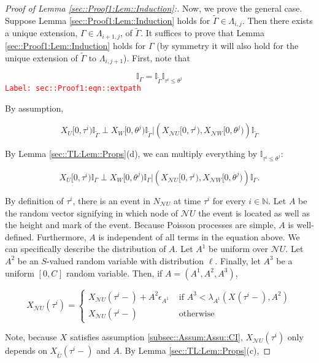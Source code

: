 \documentclass[12pt]{article}
\newcommand{\mb}{\mathbb}
\newcommand{\mc}{\mathcal}
\newcommand{\ov}{\overline}
\newcommand{\te}{\text}
\newcommand{\ep}{\epsilon}
\newcommand{\tr}{\textcolor{red}}
\newcommand{\labe}[1]{\tr{\texttt{Label: #1}}}
\newcommand{\ind}{\hspace{24pt}}
\newcommand{\neigh}{\mc{N}}					%
\renewcommand{\U}{U}							%
\newcommand{\UU}{W}								%
\newcommand{\cl}{\ov}							%
\renewcommand{\S}{S}							%
\newcommand{\ev}[1]{\ep_{#1}}					%
\newcommand{\poiss}[1]{N_{#1}}						%
\newcommand{\rt}[1]{\tau^{#1}}						%
\newcommand{\rtt}[1]{\theta^{#1}}					%
\newcommand{\itt}{i}								%
\newcommand{\ittt}{j}								%
\newcommand{\rxvt}[2]{X_{#1}{(#2)}}					%
\newcommand{\rxvts}[2]{X_{#1}{#2}}					%
\newcommand{\rate}[1]{\lambda_{#1}}					%
\newcommand{\const}[1]{C_{#1}}						%
\newcommand{\Sm}{\ell}								%
\newcommand{\alt}{\widetilde}						%
\newcommand{\apath}{\Gamma}						%
\newcommand{\pathset}[2]{\Lambda_{#1,#2}}			%
\newcommand{\rv}{A}								%
\begin{document}
\begin{proof}[Proof of Lemma \ref{sec::Proof1:Lem::Induction}:]
\ind Now, we prove the general case. Suppose Lemma \ref{sec::Proof1:Lem::Induction} holds for \(\alt{\apath} \in \pathset{\itt}{\ittt}\). Then there exists a unique extension, \(\apath \in \pathset{\itt+1}{\ittt}\), of \(\alt{\apath}\). It suffices to prove that Lemma \ref{sec::Proof1:Lem::Induction} holds for \(\apath\) (by symmetry it will also hold for the unique extension of \(\alt{\apath} \te{ to } \pathset{\itt}{\ittt+1}\)). First, note that

\begin{equation}
\mb{I}_{\apath} = \mb{I}_{\alt{\apath}}\mb{I}_{\rt{\itt} \leq \rtt{\ittt}}
\label{sec::Proof1:eqn::extpath}
\end{equation}
\labe{sec::Proof1:eqn::extpath}

By assumption,

\[\rxvts{\U}{[0,\rt{\itt})}\mb{I}_{\alt{\apath}}\perp \rxvts{\UU}{[0,\rtt{\ittt})}\mb{I}_{\alt{\apath}}|\left(\rxvts{\neigh{\U}}{[0,\rt{\itt})},\rxvts{\neigh{\UU}}{[0,\rtt{\ittt})}\right)\mb{I}_{\alt{\apath}}\]

By Lemma \ref{sec::TL:Lem::Props}(d), we can multiply everything by \(\mb{I}_{\rt{\itt} \leq \rtt{\ittt}}\):

\[\rxvts{\U}{[0,\rt{\itt})}\mb{I}_{\apath}\perp \rxvts{\UU}{[0,\rtt{\ittt})}\mb{I}_{\apath}|\left(\rxvts{\neigh{\U}}{[0,\rt{\itt})},\rxvts{\neigh{\UU}}{[0,\rtt{\ittt})}\right)\mb{I}_{\apath}.\]

By definition of \(\rt{\itt}\), there is an event in \(\poiss{\neigh{\U}}\) at time \(\rt{\itt}\) for every \(\itt \in \mb{ N}\). Let \(\rv\) be the random vector signifying in which node of \(\neigh{\U}\) the event is located as well as the height and mark of the event. Because Poisson processes are simple, \(\rv\) is well-defined. Furthermore, \(\rv\) is independent of all terms in the equation above. We can specifically describe the distribution of \(\rv\). Let \(\rv^1\) be uniform over \(\neigh{\U}\). Let \(\rv^2\) be an \(\S\)-valued random variable with distribution \(\Sm\). Finally, let \(\rv^3\) be a uniform \([0,\const{}]\) random variable. Then, if \(\rv=(\rv^1,\rv^2,\rv^3)\),

\[\rxvt{\neigh{\U}}{\rt{\itt}} = \begin{cases}
\rxvt{\neigh{\U}}{\rt{\itt}-} + \rv^2\ev{\rv^1} &\te{ if } \rv^3< \rate{\rv^1}(\rxvt{}{\rt{\itt}-}, \rv^2)\\
\rxvt{\neigh{\U}}{\rt{\itt}-} &\te{ otherwise}
\end{cases}\]

Note, because \(\rxvts{}{}\) satisfies assumption \ref{subsec::Assum:Assu::CI}, \(\rxvt{\neigh{\U}}{\rt{\itt}}\) only depends on \(\rxvt{\cl{\cl{\U}}}{\rt{\itt}-}\) and \(\rv\). By Lemma \ref{sec::TL:Lem::Props}(c), 


\end{proof}
\end{document}
